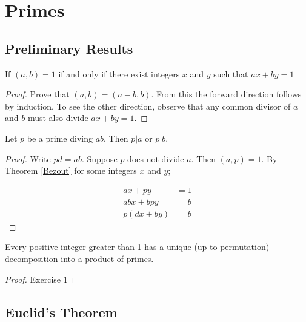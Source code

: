 \section{Primes}

\subsection{Preliminary Results}

\begin{theorem}\label{Bezout}
    If $(a,b) = 1$ if and only if there exist integers $x$ and $y$ such that $ax + by = 1$
\end{theorem}

\begin{proof}
Prove that $(a, b) = (a-b, b)$. From this the forward direction follows by induction. To see the other direction, observe that any common divisor of $a$ and $b$ 
must also divide $ax + by = 1$.
\end{proof}

\begin{lemma}
Let $p$ be a prime diving $ab$. Then $p|a$ or $p|b$.
\end{lemma}
\begin{proof}
    Write $pd = ab$. Suppose $p$ does not divide $a$. Then $(a,p) = 1$. By Theorem \ref{Bezout} for some integers $x$ and $y$;

    \begin{align*}
        ax + py &= 1 \\
        abx + bpy &= b \\
        p(dx + by) &= b
    \end{align*}
\end{proof}

\begin{theorem}
    \label{FTA}
    Every positive integer greater than 1 has a unique (up to permutation) decomposition into a product of primes.
\end{theorem}

\begin{proof}
    Exercise 1
\end{proof}

\subsection{Euclid's Theorem}

